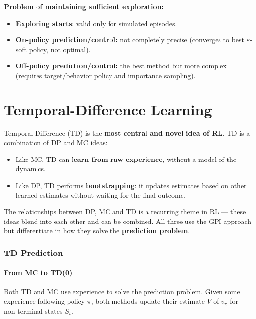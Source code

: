 \documentclass[11pt,a4paper]{article}
\theoremstyle{definition}
\theoremstyle{plain}
\theoremstyle{remark}
\begin{document}
\textbf{Problem of maintaining sufficient exploration:}
\begin{itemize}
    \item \textbf{Exploring starts:} valid only for simulated episodes.
    \item \textbf{On-policy prediction/control:} not completely precise (converges to best $\varepsilon$-soft policy, not optimal).
    \item \textbf{Off-policy prediction/control:} the best method but more complex (requires target/behavior policy and importance sampling).
\end{itemize}


\part{Temporal-Difference Learning}

Temporal Difference (TD) is the \textbf{most central and novel idea of RL}. TD is a combination of DP and MC ideas:
\begin{itemize}
    \item Like MC, TD can \textbf{learn from raw experience}, without a model of the dynamics.
    \item Like DP, TD performs \textbf{bootstrapping}: it updates estimates based on other learned estimates without waiting for the final outcome.
\end{itemize}

The relationships between DP, MC and TD is a recurring theme in RL — these ideas blend into each other and can be combined. All three use the GPI approach but differentiate in how they solve the \textbf{prediction problem}.

\section{TD Prediction}

\subsection{From MC to TD(0)}

Both TD and MC use experience to solve the prediction problem. Given some experience following policy $\pi$, both methods update their estimate $V$ of $v_\pi$ for non-terminal states $S_t$.
\end{document}
